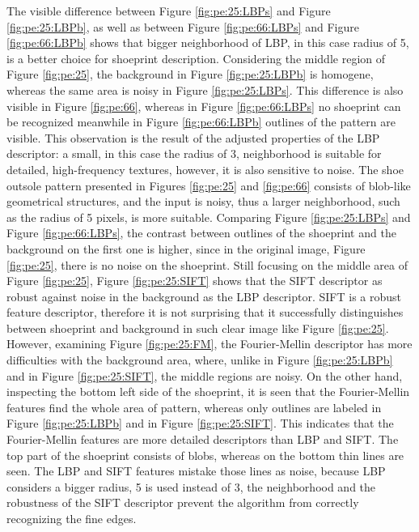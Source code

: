 \documentclass[draft,final]{vutinfth} %
\begin{document}
\par
The visible difference between Figure \ref{fig:pe:25:LBPs} and Figure \ref{fig:pe:25:LBPb}, as well as between Figure \ref{fig:pe:66:LBPs} and Figure \ref{fig:pe:66:LBPb} shows that bigger neighborhood of LBP, in this case radius of 5, is a better choice for shoeprint description. 
Considering the middle region of Figure \ref{fig:pe:25}, the background in Figure \ref{fig:pe:25:LBPb} is homogene, whereas the same area is noisy in Figure \ref{fig:pe:25:LBPs}.
This difference is also visible in Figure \ref{fig:pe:66}, whereas in Figure \ref{fig:pe:66:LBPs} no shoeprint can be recognized meanwhile in Figure \ref{fig:pe:66:LBPb} outlines of the pattern are visible.
This observation is the result of the adjusted properties of the LBP descriptor: a small, in this case the radius of 3, neighborhood is suitable for detailed, high-frequency textures, however, it is also sensitive to noise.
The shoe outsole pattern presented in Figures \ref{fig:pe:25}  and \ref{fig:pe:66} consists of blob-like geometrical structures, and the input is noisy, thus a larger neighborhood, such as the radius of 5 pixels, is more suitable.
Comparing Figure \ref{fig:pe:25:LBPs} and Figure \ref{fig:pe:66:LBPs}, the contrast between outlines of the shoeprint and the background on the first one is higher, since in the original image, Figure \ref{fig:pe:25}, there is no noise on the shoeprint.
Still focusing on the middle area of Figure \ref{fig:pe:25}, Figure \ref{fig:pe:25:SIFT} shows that the SIFT descriptor as robust against noise in the background as the LBP descriptor.
SIFT is a robust feature descriptor, therefore it is not surprising that it successfully distinguishes between shoeprint and background in such clear image like Figure \ref{fig:pe:25}.
However, examining Figure  \ref{fig:pe:25:FM}, the Fourier-Mellin descriptor has more difficulties with the background area, where, unlike in Figure \ref{fig:pe:25:LBPb} and in Figure \ref{fig:pe:25:SIFT}, the middle regions are noisy.
On the other hand, inspecting the bottom left side of the shoeprint, it is seen that the Fourier-Mellin features find the whole area of pattern, whereas only outlines are labeled in Figure \ref{fig:pe:25:LBPb} and in Figure \ref{fig:pe:25:SIFT}.
This indicates that the Fourier-Mellin features are more detailed descriptors than LBP and SIFT. 
The top part of the shoeprint consists of blobs, whereas on the bottom thin lines are seen.
The LBP and SIFT features mistake those lines as noise, because LBP considers a bigger radius, 5 is used instead of 3, the neighborhood and the robustness of the SIFT descriptor prevent the algorithm from correctly recognizing the fine edges.
\end{document}

